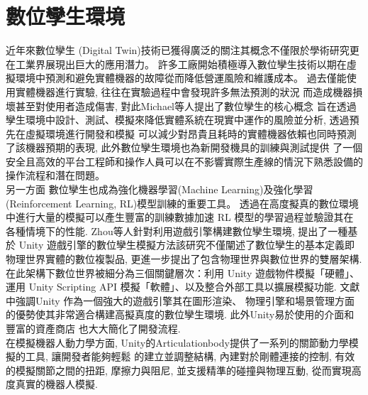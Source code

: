 \section{數位孿生環境}
近年來數位孿生 (Digital Twin)技術已獲得廣泛的關注其概念不僅限於學術研究更在工業界展現出巨大的應用潛力。
許多工廠開始積極導入數位孿生技術以期在虛擬環境中預測和避免實體機器的故障從而降低營運風險和維護成本。
過去僅能使用實體機器進行實驗, 往往在實驗過程中會發現許多無法預測的狀況
而造成機器損壞甚至對使用者造成傷害, 對此Michael等人\cite{Grieves2017DigitalTwin}提出了數位孿生的核心概念
旨在透過孿生環境中設計、測試、模擬來降低實體系統在現實中運作的風險並分析, 透過預先在虛擬環境進行開發和模擬
可以減少對昂貴且耗時的實體機器依賴也同時預測了該機器預期的表現, 此外數位孿生環境也為新開發機具的訓練與測試提供
了一個安全且高效的平台工程師和操作人員可以在不影響實際生產線的情況下熟悉設備的操作流程和潛在問題。\\
另一方面
數位孿生也成為強化機器學習(Machine Learning)及強化學習(Reinforcement Learning, RL)模型訓練的重要工具。
透過在高度擬真的數位環境中進行大量的模擬可以產生豐富的訓練數據加速 RL 模型的學習過程並驗證其在各種情境下的性能.
Zhou等人\cite{DigitalTwin}針對利用遊戲引擎構建數位孿生環境,
提出了一種基於 Unity 遊戲引擎的數位孿生模擬方法該研究不僅闡述了數位孿生的基本定義即物理世界實體的數位複製品,
更進一步提出了包含物理世界與數位世界的雙層架構. 在此架構下數位世界被細分為三個關鍵層次：利用 Unity 遊戲物件模擬「硬體」、
運用 Unity Scripting API 模擬「軟體」、以及整合外部工具以擴展模擬功能. 文獻中強調Unity 作為一個強大的遊戲引擎其在圖形渲染、
物理引擎和場景管理方面的優勢使其非常適合構建高擬真度的數位孿生環境. 此外Unity易於使用的介面和豐富的資產商店 也大大簡化了開發流程. \\
在模擬機器人動力學方面, Unity的Articulationbody\cite{UnityArticulation2024}提供了一系列的關節動力學模擬的工具, 讓開發者能夠輕鬆
的建立並調整結構, 內建對於剛體連接的控制, 有效的模擬關節之間的扭距, 摩擦力與阻尼, 並支援精準的碰撞與物理互動, 從而實現高度真實的機器人模擬.
